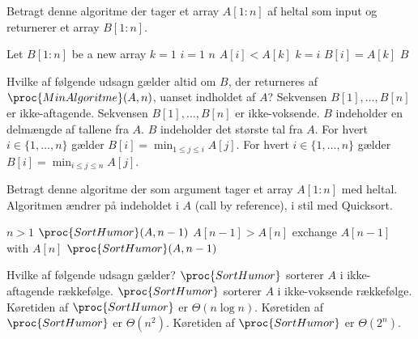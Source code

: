 


Betragt denne algoritme der tager et array $A[1:n]$ af heltal som input og returnerer et array $B[1:n]$.

\begin{codebox}
  \li Let $B[1:n]$ be a new array
  \li $k=1$
  \li \For $i = 1$ \To $n$
  \li \Do \If $A[i]<A[k]$ \Do
  \li $k=i$
  \End
  \li $B[i]=A[k]$
  \End
  \li \Return $B$
  \End
\end{codebox}

\noindent
Hvilke af følgende udsagn gælder altid om $B$, der returneres af $\proc{MinAlgoritme}(A, n)$, uanset indholdet af $A$?
\fleresvar
\mulighederstart
\svar Sekvensen $B[1],\dots,B[n]$ er ikke-aftagende.
\svar Sekvensen $B[1],\dots,B[n]$ er ikke-voksende.\korrekt
\svar $B$ indeholder en delmængde af tallene fra $A$.\korrekt
\svar $B$ indeholder det største tal fra $A$.
\svar For hvert $i\in\{1,\ldots,n\}$ gælder $B[i]=\min_{1\leq j\leq i} A[j]$.\korrekt
\svar For hvert $i\in\{1,\ldots,n\}$ gælder $B[i]=\min_{i\leq j\leq n} A[j]$.

\mulighederslut
{}



Betragt denne algoritme der som argument tager et array $A[1:n]$ med heltal.
Algoritmen ændrer på indeholdet i $A$ (call by reference), i stil med {\sc Quicksort}.

\begin{codebox}
  \li \If $n>1$ \Do
  \li $\proc{SortHumor}(A,n-1)$
  \li \If $A[n-1]>A[n]$ \Do
  \li exchange $A[n-1]$ with $A[n]$ \End
  \li $\proc{SortHumor}(A,n-1)$
  \End
\end{codebox}

\noindent
Hvilke af følgende udsagn gælder?
\fleresvar
\mulighederstart
\svar $\proc{SortHumor}$ sorterer $A$ i ikke-aftagende rækkefølge. \korrekt 
\svar $\proc{SortHumor}$ sorterer $A$ i ikke-voksende rækkefølge.
\svar Køretiden af $\proc{SortHumor}$ er $\Theta(n \log n)$.
\svar Køretiden af $\proc{SortHumor}$ er $\Theta(n^2)$.
\svar Køretiden af $\proc{SortHumor}$ er $\Theta(2^n)$.\korrekt

